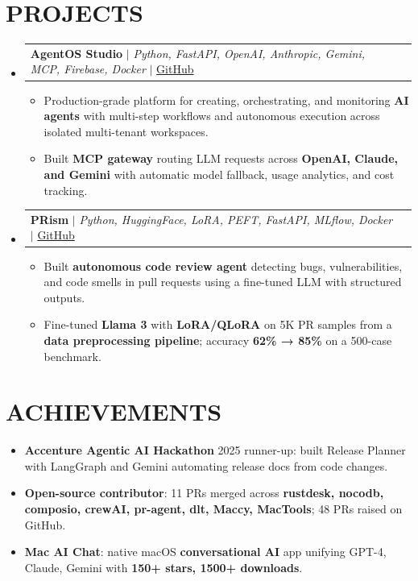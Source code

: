 \documentclass[a4paper,11pt]{article}
\makeatletter
\newcommand{\resumeItem}[1]{
  \item\small{{#1 \vspace{-4pt}}}
}
\newcommand{\resumeProjectHeading}[2]{
    \item
    \begin{tabular*}{\textwidth}{l@{\extracolsep{\fill}}r}
      #1 & {\color{dark-grey}\small #2} \\
    \end{tabular*}\vspace{-6pt}
}
\newcommand{\resumeSubHeadingListStart}{\begin{itemize}[leftmargin=0in, label={}]}
\newcommand{\resumeSubHeadingListEnd}{\end{itemize}\vspace{-6pt}}
\newcommand{\resumeItemListStart}{\begin{itemize}[label=\textbullet]}
\newcommand{\resumeItemListEnd}{\end{itemize}\vspace{-8pt}}
\makeatother
\begin{document}
\section{PROJECTS}
    \resumeSubHeadingListStart

      \resumeProjectHeading
          {\textbf{AgentOS Studio} $|$ \emph{Python, FastAPI, OpenAI, Anthropic, Gemini, MCP, Firebase, Docker} $|$ \href{https://github.com/bunnysayzz/AgentOS}{GitHub}}{}
          \resumeItemListStart
            \resumeItem{Production-grade platform for creating, orchestrating, and monitoring \textbf{AI agents} with multi-step workflows and autonomous execution across isolated multi-tenant workspaces.}
            \resumeItem{Built \textbf{MCP gateway} routing LLM requests across \textbf{OpenAI, Claude, and Gemini} with automatic model fallback, usage analytics, and cost tracking.}
          \resumeItemListEnd

      \resumeProjectHeading
          {\textbf{PRism} $|$ \emph{Python, HuggingFace, LoRA, PEFT, FastAPI, MLflow, Docker} $|$ \href{https://github.com/bunnysayzz/PRism}{GitHub}}{}
          \resumeItemListStart
            \resumeItem{Built \textbf{autonomous code review agent} detecting bugs, vulnerabilities, and code smells in pull requests using a fine-tuned LLM with structured outputs.}
            \resumeItem{Fine-tuned \textbf{Llama 3} with \textbf{LoRA/QLoRA} on 5K PR samples from a \textbf{data preprocessing pipeline}; accuracy \textbf{62\% → 85\%} on a 500-case benchmark.}
          \resumeItemListEnd



    \resumeSubHeadingListEnd

\section{ACHIEVEMENTS}
\resumeItemListStart
    \resumeItem{\textbf{Accenture Agentic AI Hackathon} 2025 runner-up: built Release Planner with LangGraph and Gemini automating release docs from code changes.}
    \resumeItem{\textbf{Open-source contributor}: 11 PRs merged across \textbf{rustdesk, nocodb, composio, crewAI, pr-agent, dlt, Maccy, MacTools}; 48 PRs raised on GitHub.}
    \resumeItem{\textbf{Mac AI Chat}: native macOS \textbf{conversational AI} app unifying GPT-4, Claude, Gemini with \textbf{150+ stars, 1500+ downloads}.}
\resumeItemListEnd

\end{document}
